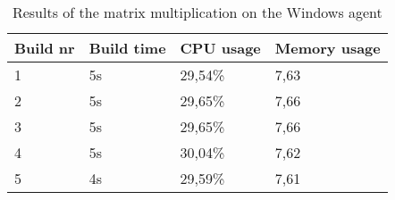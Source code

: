 \begin{table}
\centering
\begin{tabular}{|l|l|l|l|}
\hline
Build nr & Build time & CPU usage & Memory usage \\ \hline
1        & 5s         & 29,54\%   & 7,63        \\ \hline
2        & 5s         & 29,65\%   & 7,66        \\ \hline
3        & 5s         & 29,65\%   & 7,66        \\ \hline
4        & 5s         & 30,04\%   & 7,62        \\ \hline
5        & 4s         & 29,59\%   & 7,61        \\ \hline
\end{tabular}
\caption{Results of the matrix multiplication on the Windows agent}
\end{table}
